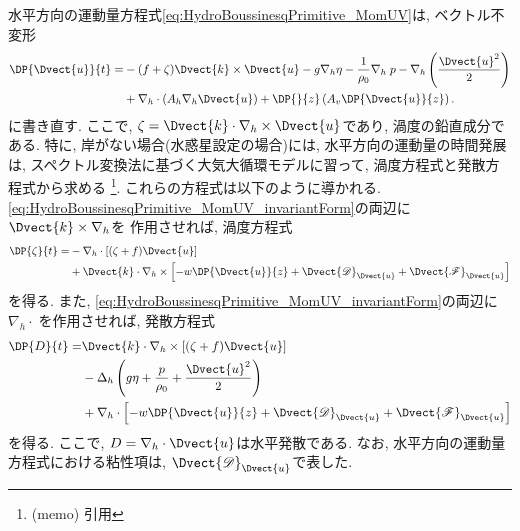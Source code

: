 水平方向の運動量方程式\eqref{eq:HydroBoussinesqPrimitive_MomUV}は,
ベクトル不変形
\begin{align}
 \DP{\Dvect{u}}{t}
 =&  - (f + \zeta) \Dvect{k} \times \Dvect{u}
     - g \nabla_h \eta
     -  \dfrac{1}{\rho_0} \nabla_h \; p
     -  \nabla_h \left(\dfrac{\Dvect{u}^2}{2} \right)
  \nonumber \\
  &  +   \nabla_h \cdot  (A_h \nabla_h \Dvect{u})
     +   \DP{}{z} \left(A_v \DP{\Dvect{u}}{z}\right). 
 \label{eq:HydroBoussinesqPrimitive_MomUV_invariantForm}   
\end{align}
に書き直す.
ここで, $\zeta=\Dvect{k}\cdot\nabla_h\times\Dvect{u}$であり,
渦度の鉛直成分である. 
特に, 岸がない場合(水惑星設定の場合)には, 水平方向の運動量の時間発展は,
スペクトル変換法に基づく大気大循環モデルに習って, 
渦度方程式と発散方程式から求める%
\footnote{
(memo) 引用
}.
これらの方程式は以下のように導かれる. 
\eqref{eq:HydroBoussinesqPrimitive_MomUV_invariantForm}の両辺に$\Dvect{k}\times\nabla_h$を
作用させれば, 渦度方程式
\begin{align}
 \DP{\zeta}{t}
 =
 & - \nabla_h \cdot \left[ (\zeta + f) \Dvect{u} \right] \\
 & + \Dvect{k} \cdot \nabla_h \times \left[
       -  w \DP{\Dvect{u}}{z}
       + \Dvect{\mathscr{D}}_{\Dvect{u}} + \Dvect{\mathscr{F}}_{\Dvect{u}}
    \right]
\label{eq:HydroBoussinesqPrimitive_Vor}
\end{align}
を得る.
また, \eqref{eq:HydroBoussinesqPrimitive_MomUV_invariantForm}の両辺に$\nabla_h \cdot \;$を作用させれば, 発散方程式
\begin{align}
    \DP{D}{t}
 =
 &   \Dvect{k} \cdot \nabla_h \times \left[ (\zeta + f) \Dvect{u} \right] \\
 & - \Delta_h \left( g\eta + \dfrac{p}{\rho_0} + \dfrac{\Dvect{u}^2}{2}  \right) \\
 & + \nabla_h \cdot \left[
       -  w \DP{\Dvect{u}}{z}
       + \Dvect{\mathscr{D}}_{\Dvect{u}} + \Dvect{\mathscr{F}}_{\Dvect{u}}
    \right]
\label{eq:HydroBoussinesqPrimitive_Div}
\end{align}
を得る.
ここで, $D=\nabla_h \cdot \Dvect{u}$は水平発散である. 
なお, 水平方向の運動量方程式における粘性項は, $\Dvect{\mathscr{D}}_{\Dvect{u}}$で表した. 


